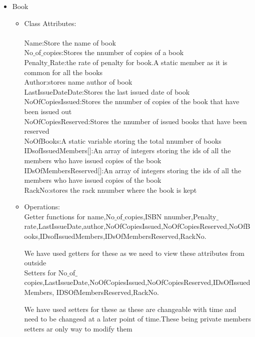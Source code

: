 \documentclass[a4paper]{article}
\begin{document}
\begin{itemize}
\item Book
\begin{itemize}
\item Class Attributes:\\
\\Name:Store the name of book
\\No$\_$of$\_$copies:Stores the nnumber of copies of a book
\\Penalty$\_$Rate:the rate of penalty for book.A static member as it is common for all the books
\\Author:stores name  author of book 
\\LastIssueDateDate:Stores the last issued date of book
\\NoOfCopiesIssued:Stores the nnumber of copies of the book that have been issued out
\\NoOfCopiesReserved:Stores the nnumber of issued books that have been reserved
\\NoOfBooks:A static variable storing the total nnumber of books
\\IDsofIssuedMembers[]:An array of integers storing the ids of all the members who have issued copies of the book
\\IDsOfMembersReserved[]:An array of integers storing the ids of all the members who have issued copies of the book
\\RackNo:stores the rack nnumber where the book is kept

\item Operations:
\\Getter functions for name,No$\_$of$\_$copies,ISBN nnumber,Penalty$\_$rate,LastIssueDate,author,NoOfCopiesIssued,NoOfCopiesReserved,NoOfBooks,IDsofIssuedMembers,IDsOfMembersReserved,RackNo.

We have used getters for these as we need to view these attributes from outside 
\\
Setters for No$\_$of$\_$copies,LastIssueDate,NoOfCopiesIssued,NoOfCopiesReserved,IDsOfIssuedMembers, IDSOfMembersReserved,RackNo.

We have used setters for these as these are changeable with time and need to be changesd at a later point of time.These being private members setters ar only way to modify them
\end{itemize}



\end{itemize}
\end{document}
